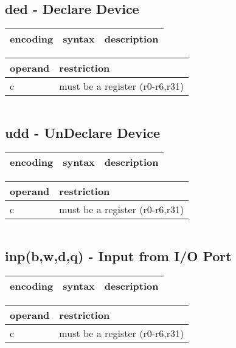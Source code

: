 \documentclass[letterpaper,10pt,openright,twoside,onecolumn]{book}
\begin{document}
\subsection{ded - Declare Device}
  \begin{tabular}{|l|l|l|}
   \hline
    encoding & syntax & description \\
   \hline
   \hline
  \end{tabular}
  \flushleft
  \begin{tabular}{|l|l|}
   \hline
    operand & restriction \\
   \hline
    c & must be a register (r0-r6,r31) \\
   \hline
  \end{tabular}
  \begin{verbatim}
  \end{verbatim}
\newpage\subsection{udd - UnDeclare Device}
  \begin{tabular}{|l|l|l|}
   \hline
    encoding & syntax & description \\
   \hline
   \hline
  \end{tabular}
  \flushleft
  \begin{tabular}{|l|l|}
   \hline
    operand & restriction \\
   \hline
    c & must be a register (r0-r6,r31) \\
   \hline
  \end{tabular}
  \begin{verbatim}
  \end{verbatim}
\newpage\subsection{inp(b,w,d,q) - Input from I/O Port}
  \begin{tabular}{|l|l|l|}
   \hline
    encoding & syntax & description \\
   \hline
   \hline
  \end{tabular}
  \flushleft
  \begin{tabular}{|l|l|}
   \hline
    operand & restriction \\
   \hline
    c & must be a register (r0-r6,r31) \\
   \hline
  \end{tabular}
  \begin{verbatim}
  \end{verbatim}
\end{document}
